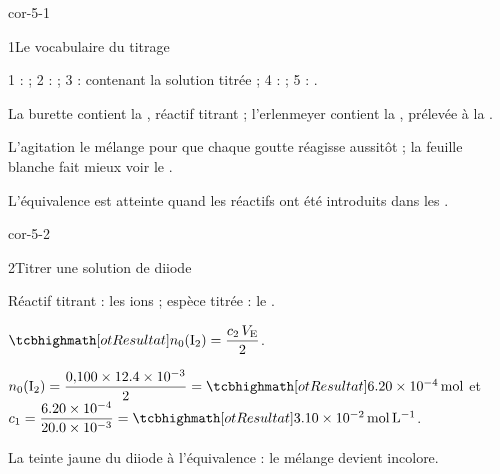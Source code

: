 \corrigesSouples

\begin{blocLivre}{cor-5-1}
\begin{corrige}{1}{Le vocabulaire du titrage}
\begin{questions}
\item 1 :  ; 2 :  ; 3 :  contenant la solution titrée ; 4 :  ;
5 : .
\item La burette contient la , réactif titrant ; l'erlenmeyer contient la ,
prélevée à la .
\item L'agitation  le mélange pour que chaque goutte réagisse aussitôt ; la feuille blanche fait mieux
voir le .
\item L'équivalence est atteinte quand les réactifs ont été introduits dans les .
\end{questions}
\end{corrige}
\end{blocLivre}
\begin{blocLivre}{cor-5-2}
\begin{corrige}{2}{Titrer une solution de diiode}
\begin{questions}
\item Réactif titrant : les ions  ; espèce titrée : le .
\item $\res{n_0(\ce{I2})=\dfrac{c_2\,V_\mathrm{E}}{2}}$.
\item $n_0(\ce{I2})=\dfrac{0{,}100\times\num{12.4e-3}}{2}=\res{\qty{6,20e-4}{mol}}$ et $c_1=\dfrac{\num{6.20e-4}}{\num{20.0e-3}}=\res{\qty{3,10e-2}{mol.L^{-1}}}$.
\item La teinte jaune du diiode  à l'équivalence : le mélange devient incolore.
\end{questions}
\end{corrige}
\end{blocLivre}

